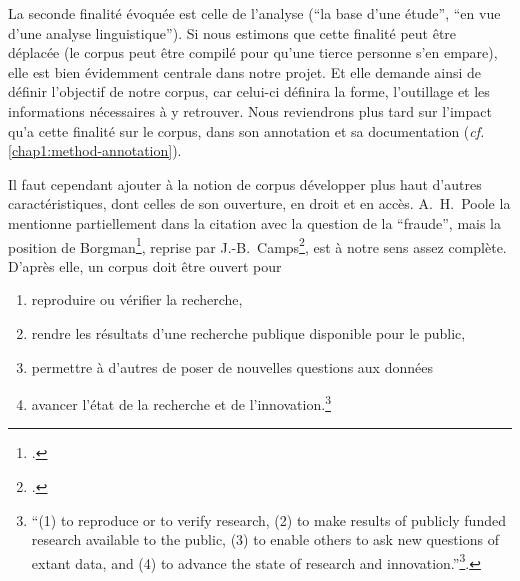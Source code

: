 La seconde finalité évoquée est celle de l'analyse (``la base d'une étude'', ``en vue d'une analyse linguistique''). Si nous estimons que cette finalité peut être déplacée (le corpus peut être compilé pour qu'une tierce personne s'en empare), elle est bien évidemment centrale dans notre projet. Et elle demande ainsi de définir l'objectif de notre corpus, car celui-ci définira la forme, l'outillage et les informations nécessaires à y retrouver. Nous reviendrons plus tard sur l'impact qu'a cette finalité sur le corpus, dans son annotation et sa documentation (\textit{cf.} \ref{chap1:method-annotation}).

Il faut cependant ajouter à la notion de corpus développer plus haut d'autres caractéristiques, dont celles de son ouverture, en droit et en accès. A.~H.~Poole la mentionne partiellement dans la citation avec la question de la ``fraude'', mais la position de Borgman\footcite{borgman2012conundrum}, reprise par J.-B.~Camps\footcite{camps_ou_2018}, est à notre sens assez complète. D'après elle, un corpus doit être ouvert pour
\begin{enumerate}
    \item reproduire ou vérifier la recherche,
    \item rendre les résultats d'une recherche publique disponible pour le public,
    \item permettre à d'autres de poser de nouvelles questions aux données
    \item avancer l'état de la recherche et de l'innovation.\footnote{``(1) to reproduce or to verify research, (2) to make results of publicly funded research available to the public, (3) to enable others to ask new questions of extant data, and (4) to advance the state of research and innovation.''\footnote{\cite{borgman2012conundrum} chez \cite{camps_ou_2018}}.}
\end{enumerate}

